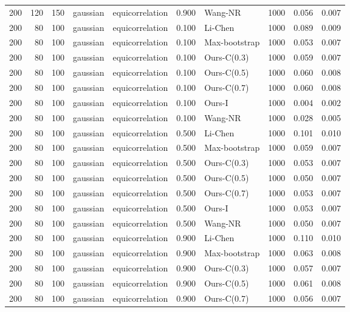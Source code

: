 \begin{tabular}{rrrllrlrrr}
200 & 120 & 150 & gaussian & equicorrelation & 0.900 & Wang-NR & 1000 & 0.056 & 0.007 \\
200 & 80 & 100 & gaussian & equicorrelation & 0.100 & Li-Chen & 1000 & 0.089 & 0.009 \\
200 & 80 & 100 & gaussian & equicorrelation & 0.100 & Max-bootstrap & 1000 & 0.053 & 0.007 \\
200 & 80 & 100 & gaussian & equicorrelation & 0.100 & Ours-C(0.3) & 1000 & 0.059 & 0.007 \\
200 & 80 & 100 & gaussian & equicorrelation & 0.100 & Ours-C(0.5) & 1000 & 0.060 & 0.008 \\
200 & 80 & 100 & gaussian & equicorrelation & 0.100 & Ours-C(0.7) & 1000 & 0.060 & 0.008 \\
200 & 80 & 100 & gaussian & equicorrelation & 0.100 & Ours-I & 1000 & 0.004 & 0.002 \\
200 & 80 & 100 & gaussian & equicorrelation & 0.100 & Wang-NR & 1000 & 0.028 & 0.005 \\
200 & 80 & 100 & gaussian & equicorrelation & 0.500 & Li-Chen & 1000 & 0.101 & 0.010 \\
200 & 80 & 100 & gaussian & equicorrelation & 0.500 & Max-bootstrap & 1000 & 0.059 & 0.007 \\
200 & 80 & 100 & gaussian & equicorrelation & 0.500 & Ours-C(0.3) & 1000 & 0.053 & 0.007 \\
200 & 80 & 100 & gaussian & equicorrelation & 0.500 & Ours-C(0.5) & 1000 & 0.050 & 0.007 \\
200 & 80 & 100 & gaussian & equicorrelation & 0.500 & Ours-C(0.7) & 1000 & 0.053 & 0.007 \\
200 & 80 & 100 & gaussian & equicorrelation & 0.500 & Ours-I & 1000 & 0.053 & 0.007 \\
200 & 80 & 100 & gaussian & equicorrelation & 0.500 & Wang-NR & 1000 & 0.050 & 0.007 \\
200 & 80 & 100 & gaussian & equicorrelation & 0.900 & Li-Chen & 1000 & 0.110 & 0.010 \\
200 & 80 & 100 & gaussian & equicorrelation & 0.900 & Max-bootstrap & 1000 & 0.063 & 0.008 \\
200 & 80 & 100 & gaussian & equicorrelation & 0.900 & Ours-C(0.3) & 1000 & 0.057 & 0.007 \\
200 & 80 & 100 & gaussian & equicorrelation & 0.900 & Ours-C(0.5) & 1000 & 0.061 & 0.008 \\
200 & 80 & 100 & gaussian & equicorrelation & 0.900 & Ours-C(0.7) & 1000 & 0.056 & 0.007 \\

\end{tabular}
